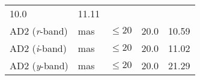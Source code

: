 \documentclass[DM,toc]{lsstdoc}
\begin{document}
\begin{longtable}[]{@{}lllll@{}}
\begin{minipage}[t]{0.22\columnwidth}
10.0\strut
\end{minipage} & \begin{minipage}[t]{0.17\columnwidth}\raggedright\strut
11.11\strut
\end{minipage}\tabularnewline
\begin{minipage}[t]{0.19\columnwidth}\raggedright\strut
AD2 (\emph{r}-band)\strut
\end{minipage} & \begin{minipage}[t]{0.08\columnwidth}\raggedright\strut
mas\strut
\end{minipage} & \begin{minipage}[t]{0.20\columnwidth}\raggedright\strut
\(\leq 20\)\strut
\end{minipage} & \begin{minipage}[t]{0.22\columnwidth}\raggedright\strut
20.0\strut
\end{minipage} & \begin{minipage}[t]{0.17\columnwidth}\raggedright\strut
10.59\strut
\end{minipage}\tabularnewline
\begin{minipage}[t]{0.19\columnwidth}\raggedright\strut
AD2 (\emph{i}-band)\strut
\end{minipage} & \begin{minipage}[t]{0.08\columnwidth}\raggedright\strut
mas\strut
\end{minipage} & \begin{minipage}[t]{0.20\columnwidth}\raggedright\strut
\(\leq 20\)\strut
\end{minipage} & \begin{minipage}[t]{0.22\columnwidth}\raggedright\strut
20.0\strut
\end{minipage} & \begin{minipage}[t]{0.17\columnwidth}\raggedright\strut
11.02\strut
\end{minipage}\tabularnewline
\begin{minipage}[t]{0.19\columnwidth}\raggedright\strut
AD2 (\emph{y}-band)\strut
\end{minipage} & \begin{minipage}[t]{0.08\columnwidth}\raggedright\strut
mas\strut
\end{minipage} & \begin{minipage}[t]{0.20\columnwidth}\raggedright\strut
\(\leq 20\)\strut
\end{minipage} & \begin{minipage}[t]{0.22\columnwidth}\raggedright\strut
20.0\strut
\end{minipage} & \begin{minipage}[t]{0.17\columnwidth}\raggedright\strut
21.29\strut
\end{minipage}\tabularnewline
\bottomrule
\end{longtable}
\end{document}
